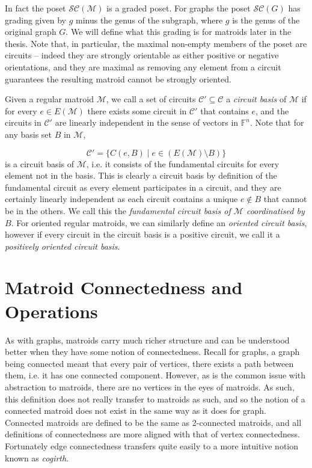 \documentclass[12pt]{report}
\theoremstyle{definition}
\def\F{\mathbb F}
\def\calC{\mathcal C}
\def\calM{\mathcal M}
\def\calS{\mathcal S}
\theoremstyle{upright}
\begin{document}
In fact the poset $\calS\calC(\calM)$ is a graded poset.
For graphs the poset $\calS\calC(G)$ has grading given by $g$ minus the genus of the subgraph, where $g$ is the genus of the original graph $G$.
We will define what this grading is for matroids later in the thesis.
Note that, in particular, the maximal non-empty members of the poset are circuits -- indeed they are strongly orientable as either positive or negative orientations, and they are maximal as removing any element from a circuit guarantees the resulting matroid cannot be strongly oriented.

Given a regular matroid $\calM$, we call a set of circuits $\calC'\subseteq\calC$ a \textit{circuit basis} of $\calM$ if for every $e\in E(\calM)$ there exists some circuit in $\calC'$ that contains $e$, and the circuits in $\calC'$ are linearly independent in the sense of vectors in $\F^n$.
Note that for any basis set $B$ in $\calM$,

\[\calC'=\{C(e, B)\;|\;e\in(E(\calM)\setminus B)\}\]
is a circuit basis of $\calM$, i.e. it consists of the fundamental circuits for every element not in the basis.
This is clearly a circuit basis by definition of the fundamental circuit as every element participates in a circuit, and they are certainly linearly independent as each circuit contains a unique $e\not\in B$ that cannot be in the others.
We call this the \textit{fundamental circuit basis of $\calM$ coordinatised by $B$}.
For oriented regular matroids, we can similarly define an \textit{oriented circuit basis}, however if every circuit in the circuit basis is a positive circuit, we call it a \textit{positively oriented circuit basis}.

\chapter{Matroid Connectedness and Operations}
\label{chap:MatroidConnectednessOperations}

As with graphs, matroids carry much richer structure and can be understood better when they have some notion of connectedness.
Recall for graphs, a graph being connected meant that every pair of vertices, there exists a path between them, i.e. it has one connected component.
However, as is the common issue with abstraction to matroids, there are no vertices in the eyes of matroids.
As such, this definition does not really transfer to matroids as such, and so the notion of a connected matroid does not exist in the same way as it does for graph.
Connected matroids are defined to be the same as 2-connected matroids, and all definitions of connectedness are more aligned with that of vertex connectedness.
Fortunately edge connectedness transfers quite easily to a more intuitive notion known as \textit{cogirth}.
\end{document}
